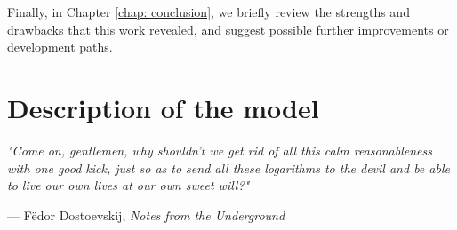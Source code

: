 \documentclass[12pt,	%
	a4paper,		%
	twoside,		%
	openright,		%
	titlepage,%
	]{book}
\theoremstyle{definition}
\begin{document}
Finally, in Chapter \ref{chap: conclusion}, we briefly review the strengths and drawbacks that this work revealed, and suggest possible further improvements or development paths.








\chapter{Description of the model}
\label{cap: description of the model}

\epigraph{\itshape
"Come on, gentlemen, why shouldn't we get rid of all this calm reasonableness with one good kick, just so as to send all these logarithms to the devil and be able to live our own lives at our own sweet will?"
}{--- F\"{e}dor Dostoevskij, \textit{Notes from the Underground}}
\end{document}
